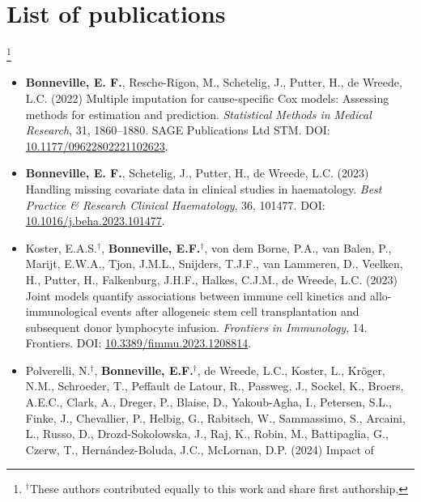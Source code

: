 \documentclass[
  letterpaper,
  paper=240mm:170mm,
  twoside=true,
  open=right,
  fontsize=10pt,
  pagesize=false,
  BCOR=15mm,
  DIV=14,
  headinclude=true,
  footinclude=false,
  headsepline=on]{scrbook}
\newcommand\blfootnote[1]{%
  \begingroup
  \renewcommand\thefootnote{}\footnote{#1}%
  \addtocounter{footnote}{-1}%
  \endgroup
}
\begin{document}

\chapter*{List of publications}\label{list-of-publications}


\blfootnote{$^\dagger$These authors contributed equally to this work and share first authorship.}

\begin{itemize}
\item
  \textbf{Bonneville, E. F.}, Resche-Rigon, M., Schetelig, J., Putter,
  H., de Wreede, L.C. (2022) Multiple imputation for cause-specific Cox
  models: Assessing methods for estimation and prediction.
  \emph{Statistical Methods in Medical Research}, 31, 1860--1880. SAGE
  Publications Ltd STM. DOI:
  \href{https://doi.org/10.1177/09622802221102623}{10.1177/09622802221102623}.
\item
  \textbf{Bonneville, E. F.}, Schetelig, J., Putter, H., de Wreede, L.C.
  (2023) Handling missing covariate data in clinical studies in
  haematology. \emph{Best Practice \& Research Clinical Haematology},
  36, 101477. DOI:
  \href{https://doi.org/10.1016/j.beha.2023.101477}{10.1016/j.beha.2023.101477}.
\item
  Koster, E.A.S.\(^\dagger\), \textbf{Bonneville, E.F.}\(^\dagger\), von
  dem Borne, P.A., van Balen, P., Marijt, E.W.A., Tjon, J.M.L.,
  Snijders, T.J.F., van Lammeren, D., Veelken, H., Putter, H.,
  Falkenburg, J.H.F., Halkes, C.J.M., de Wreede, L.C. (2023) Joint
  models quantify associations between immune cell kinetics and
  allo-immunological events after allogeneic stem cell transplantation
  and subsequent donor lymphocyte infusion. \emph{Frontiers in
  Immunology}, 14. Frontiers. DOI:
  \href{https://doi.org/10.3389/fimmu.2023.1208814}{10.3389/fimmu.2023.1208814}.
\item
  Polverelli, N.\(^\dagger\), \textbf{Bonneville, E.F.}\(^\dagger\), de
  Wreede, L.C., Koster, L., Kröger, N.M., Schroeder, T., Peffault de
  Latour, R., Passweg, J., Sockel, K., Broers, A.E.C., Clark, A.,
  Dreger, P., Blaise, D., Yakoub-Agha, I., Petersen, S.L., Finke, J.,
  Chevallier, P., Helbig, G., Rabitsch, W., Sammassimo, S., Arcaini, L.,
  Russo, D., Drozd-Sokolowska, J., Raj, K., Robin, M., Battipaglia, G.,
  Czerw, T., Hernández-Boluda, J.C., McLornan, D.P. (2024) Impact of

\end{itemize}
\end{document}
